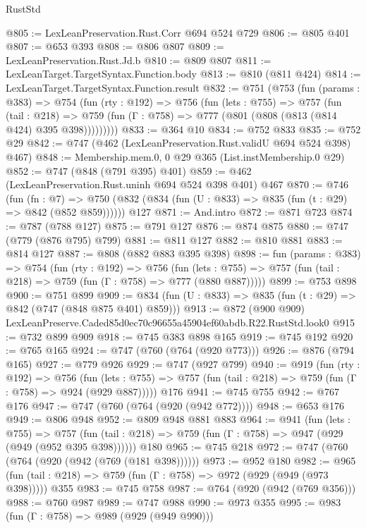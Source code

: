 \begin{lexlean}{RustStd}
\begin{coremodule}
@805 := LexLeanPreservation.Rust.Corr @694 @524 @729
@806 := @805 @401
@807 := @653 @393
@808 := @806 @807
@809 := LexLeanPreservation.Rust.Jd.b
@810 := @809 @807
@811 := LexLeanTarget.TargetSyntax.Function.body
@813 := @810 (@811 @424)
@814 := LexLeanTarget.TargetSyntax.Function.result
@832 := @751
    (@753
      (fun (params : @383) =>
      @754
        (fun (rty : @192) =>
        @756
          (fun (lets : @755) =>
          @757
            (fun (tail : @218) =>
            @759 (fun (Γ : @758) => @777 (@801 (@808 (@813 (@814 @424) @395 @398)))))))))
@833 := @364 @10
@834 := @752 @833
@835 := @752 @29
@842 := @747 (@462 (LexLeanPreservation.Rust.validU @694 @524 @398) @467)
@848 := Membership.mem.{0, 0} @29 @365 (List.instMembership.{0} @29)
@852 := @747 (@848 (@791 @395) @401)
@859 := @462 (LexLeanPreservation.Rust.uninh @694 @524 @398 @401) @467
@870 := @746
    (fun (fn : @7) =>
    @750 (@832 (@834 (fun (U : @833) => @835 (fun (t : @29) => @842 (@852 @859))))))
    @127
@871 := And.intro
@872 := @871 @723
@874 := @787 (@788 @127)
@875 := @791 @127
@876 := @874 @875
@880 := @747 (@779 (@876 @795) @799)
@881 := @811 @127
@882 := @810 @881
@883 := @814 @127
@887 := @808 (@882 @883 @395 @398)
@898 := fun (params : @383) =>
  @754
    (fun (rty : @192) =>
    @756
      (fun (lets : @755) => @757 (fun (tail : @218) => @759 (fun (Γ : @758) => @777 (@880 @887)))))
@899 := @753 @898
@900 := @751 @899
@909 := @834 (fun (U : @833) => @835 (fun (t : @29) => @842 (@747 (@848 @875 @401) @859)))
@913 := @872 (@900 @909) LexLeanPreserve.Caded85d0ec70c96655a45904ef60abdb.R22.RustStd.look0
@915 := @732 @899 @909
@918 := @745 @383 @898 @165
@919 := @745 @192
@920 := @765 @165
@924 := @747 (@760 (@764 (@920 @773)))
@926 := @876 (@794 @165)
@927 := @779 @926
@929 := @747 (@927 @799)
@940 := @919
    (fun (rty : @192) =>
    @756
      (fun (lets : @755) => @757 (fun (tail : @218) => @759 (fun (Γ : @758) => @924 (@929 @887)))))
    @176
@941 := @745 @755
@942 := @767 @176
@947 := @747 (@760 (@764 (@920 (@942 @772))))
@948 := @653 @176
@949 := @806 @948
@952 := @809 @948 @881 @883
@964 := @941
    (fun (lets : @755) =>
    @757 (fun (tail : @218) => @759 (fun (Γ : @758) => @947 (@929 (@949 (@952 @395 @398))))))
    @180
@965 := @745 @218
@972 := @747 (@760 (@764 (@920 (@942 (@769 (@181 @398))))))
@973 := @952 @180
@982 := @965 (fun (tail : @218) => @759 (fun (Γ : @758) => @972 (@929 (@949 (@973 @398))))) @355
@983 := @745 @758
@987 := @764 (@920 (@942 (@769 @356)))
@988 := @760 @987
@989 := @747 @988
@990 := @973 @355
@995 := @983 (fun (Γ : @758) => @989 (@929 (@949 @990)))

\end{coremodule}
\end{lexlean}
